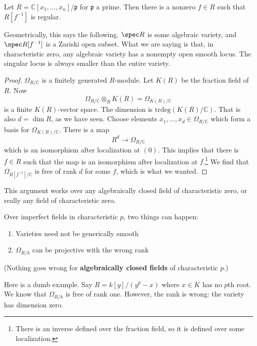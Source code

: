 \begin{corollary} 
Let $R = \mathbb{C}[x_1, \dots, x_n]/\mathfrak{p}$ for $\mathfrak{p}$ a prime.
Then there is a nonzero $f \in R$ such that $R[f^{-1}]$ is regular.
\end{corollary} 
Geometrically, this says the following. $\spec R$ is some algebraic variety,
and $\spec R[f^{-1}]$ is a Zariski open subset. What we are saying is that, in
characteristic zero, any algebraic variety has a nonempty open smooth locus.
The singular locus is always smaller than the entire variety.

\begin{proof} 
$\Omega_{R/\mathbb{C}}$ is a finitely generated $R$-module. Let $K(R) $ be the fraction field of $R$.
Now
\[ \Omega_{R/\mathbb{C}} \otimes_R K(R) = \Omega_{K(R)/\mathbb{C}}  \]
is a finite $K(R)$-vector space. The dimension is
$\mathrm{trdeg}(K(R)/\mathbb{C})$. That is also $d=\dim R$, as we have seen.
Choose elements $x_1, \dots, x_d \in \Omega_{R/\mathbb{C}}$ which form a basis
for $\Omega_{K(R)/\mathbb{C}}$. There is a map
\[ R^d \to \Omega_{R/\mathbb{C}}  \]
which is an isomorphism after localization at $(0)$. This implies that there is
$f \in R$ such that the map is an isomorphism after localization at
$f$.\footnote{There is an inverse defined over the fraction field, so it is
defined over some localization.} We find that $\Omega_{R[f^{-1}]/\mathbb{C}}$
is free of rank $d$ for some $f$, which is what we wanted.
\end{proof} 

This argument works over any algebraically closed field of characteristic
zero, or really any field of characteristic zero.
\begin{remark}[Warning] Over imperfect fields in characteristic $p$, two things can happen:
\begin{enumerate}
\item Varieties need not be generically smooth 
\item $\Omega_{R/k}$ can be projective with the wrong rank
\end{enumerate}
(Nothing goes wrong for \textbf{algebraically closed fields} of characteristic
$p$.)
\begin{example} 
Here is a dumb example. Say $R = k[y]/(y^p-x)$ where $x \in K$ has no $p$th
root. We know that $\Omega_{R/k}$ is free of rank one. However, the rank is
wrong: the variety has dimension zero.
\end{example} 
\end{remark} 

